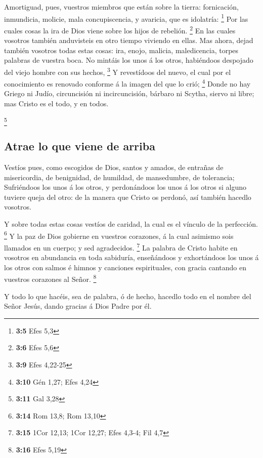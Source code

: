  Amortiguad, pues, vuestros miembros que están sobre la
tierra: fornicación, inmundicia, molicie, mala concupiscencia, y
avaricia, que es idolatría: \footnote{\textbf{3:5} Efes 5,3}
 Por las cuales cosas la ira de Dios viene sobre los hijos
de rebelión. \footnote{\textbf{3:6} Efes 5,6}  En las
cuales vosotros también anduvisteis en otro tiempo viviendo en ellas.
 Mas ahora, dejad también vosotros todas estas cosas: ira,
enojo, malicia, maledicencia, torpes palabras de vuestra boca.
 No mintáis los unos á los otros, habiéndoos despojado del
viejo hombre con sus hechos, \footnote{\textbf{3:9} Efes 4,22-25}
 Y revestídoos del nuevo, el cual por el conocimiento es
renovado conforme á la imagen del que lo crió; \footnote{\textbf{3:10}
  Gén 1,27; Efes 4,24}  Donde no hay Griego ni Judío,
circuncisión ni incircuncisión, bárbaro ni Scytha, siervo ni libre; mas
Cristo es el todo, y en todos.

\footnote{\textbf{3:11} Gal 3,28}

\hypertarget{atrae-lo-que-viene-de-arriba}{%
\subsection{Atrae lo que viene de
arriba}\label{atrae-lo-que-viene-de-arriba}}

 Vestíos pues, como escogidos de Dios, santos y amados,
de entrañas de misericordia, de benignidad, de humildad, de mansedumbre,
de tolerancia;  Sufriéndoos los unos á los otros, y
perdonándoos los unos á los otros si alguno tuviere queja del otro: de
la manera que Cristo os perdonó, así también hacedlo vosotros.

 Y sobre todas estas cosas vestíos de caridad, la cual es
el vínculo de la perfección. \footnote{\textbf{3:14} Rom 13,8; Rom 13,10}
 Y la paz de Dios gobierne en vuestros corazones, á la
cual asimismo sois llamados en un cuerpo; y sed agradecidos. \footnote{\textbf{3:15}
  1Cor 12,13; 1Cor 12,27; Efes 4,3-4; Fil 4,7}  La
palabra de Cristo habite en vosotros en abundancia en toda sabiduría,
enseñándoos y exhortándoos los unos á los otros con salmos é himnos y
canciones espirituales, con gracia cantando en vuestros corazones al
Señor. \footnote{\textbf{3:16} Efes 5,19}

 Y todo lo que hacéis, sea de palabra, ó de hecho,
hacedlo todo en el nombre del Señor Jesús, dando gracias á Dios Padre
por él.

